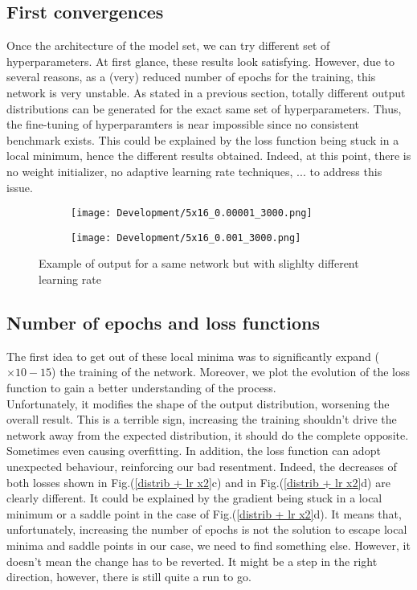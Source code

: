 \subsection{First convergences}

Once the architecture of the model set, we can try different set of hyperparameters. At first glance, these results look satisfying. However, due to several reasons, as a (very) reduced number of epochs for the training, this network is very unstable. As stated in a previous section, totally different output distributions can be generated for the exact same set of hyperparameters. Thus, the fine-tuning of hyperparamters is near impossible since no consistent benchmark exists.
This could be explained by the loss function being stuck in a local minimum, hence the different results obtained. Indeed, at this point, there is no weight initializer, no adaptive learning rate techniques, ... to address this issue.

\begin{figure}[H]
    \centering
    \begin{subfigure}{0.37\textwidth}
        \centering
        \texttt{[image: Development/5x16\_0.00001\_3000.png]}
    \end{subfigure}
    \hspace{1.3cm}
    \begin{subfigure}{0.37\textwidth}
        \centering
        \texttt{[image: Development/5x16\_0.001\_3000.png]}
    \end{subfigure}
    \caption{Example of output for a same network but with slighlty different learning rate}
\end{figure}

\subsection{Number of epochs and loss functions}

The first idea to get out of these local minima was to significantly expand ($\times 10-15$) the training of the network. Moreover, we plot the evolution of the loss function to gain a better understanding of the process.\\
Unfortunately, it modifies the shape of the output distribution, worsening the overall result. This is a terrible sign, increasing the training shouldn't drive the network away from the expected distribution, it should do the complete opposite. Sometimes even causing overfitting. In addition, the loss function can adopt unexpected behaviour, reinforcing our bad resentment.
Indeed, the decreases of both losses shown in Fig.(\ref{distrib + lr x2}c) and in Fig.(\ref{distrib + lr x2}d) are clearly different. It could be explained by the gradient being stuck in a local minimum or a saddle point in the case of Fig.(\ref{distrib + lr x2}d). It means that, unfortunately, increasing the number of epochs is not the solution to escape local minima and saddle points in our case, we need to find something else.
However, it doesn't mean the change has to be reverted. It might be a step in the right direction, however, there is still quite a run to go.

